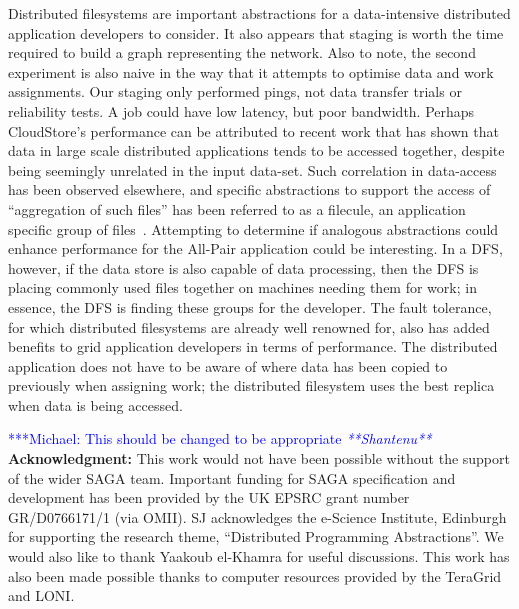 \documentclass{rspublic}
\newcommand{\micnote}[1]{ {\textcolor{blue} { ***Michael: #1 }}}
\newcommand{\micnote}[1]{}
\begin{document}
Distributed filesystems are important abstractions for a data-intensive
distributed application developers to consider. It also appears that
staging is worth the time required to build a graph representing the
network. Also to note, the second experiment is also naive in the way
that it attempts to optimise data and work assignments. Our staging only
performed pings, not data transfer trials or reliability tests. A job
could have low latency, but poor bandwidth. Perhaps CloudStore's
performance can be attributed to recent work that has shown that data in
large scale distributed applications tends to be accessed together,
despite being seemingly unrelated in the input data-set. Such
correlation in data-access has been observed elsewhere, and specific
abstractions to support the access of ``aggregation of such files'' has
been referred to as a filecule, an application specific group of
files~\citep{filecule}. Attempting to determine if analogous abstractions
could enhance performance for the All-Pair application could be
interesting.  In a DFS, however, if the data store is also capable of
data processing, then the DFS is placing commonly used files together on
machines needing them for work; in essence, the DFS is finding these
groups for the developer. The fault tolerance, for which distributed
filesystems are already well renowned for, also has added benefits to
grid application developers in terms of performance. The distributed
application does not have to be aware of where data has been copied to
previously when assigning work; the distributed filesystem uses the best
replica when data is being accessed.

\micnote{This should be changed to be appropriate \emph{**Shantenu**}}
{\bf Acknowledgment:} This work would not have been possible without the support of 
     the wider SAGA team. Important funding for SAGA
     specification and development has been provided by the UK EPSRC
     grant number GR/D0766171/1 (via OMII).  SJ acknowledges the
     e-Science Institute, Edinburgh for supporting the research theme,
     ``Distributed Programming Abstractions''.  We would also like to
     thank Yaakoub el-Khamra for useful discussions. This work has also
     been made possible thanks to computer resources provided by the
     TeraGrid and LONI.

%
 

\end{document}
